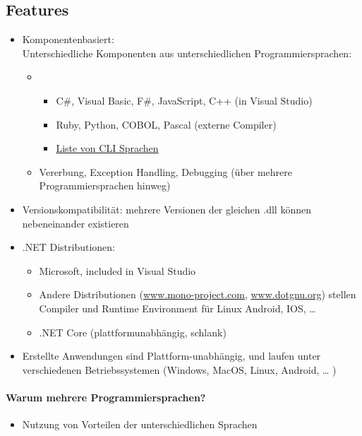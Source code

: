 \subsection{Features}
\begin{itemize}
\item Komponentenbasiert: \\
Unterschiedliche Komponenten aus unterschiedlichen Programmiersprachen:
\begin{itemize}
\item[]
\begin{itemize}
\item C\#, Visual Basic, F\#, JavaScript, C++ (in Visual Studio)
\item Ruby, Python, COBOL, Pascal (externe Compiler)
\item \href{https://en.wikipedia.org/wiki/List_of_CLI_languages}{Liste von CLI Sprachen}
\end{itemize}
\item Vererbung, Exception Handling, Debugging (über mehrere Programmiersprachen hinweg)
\end{itemize}
\item Versionskompatibilität: mehrere Versionen der gleichen .dll können nebeneinander existieren
\item .NET Distributionen:
\begin{itemize}
\item Microsoft, included in Visual Studio
\item Andere Distributionen (\href{http://www.mono-project.com}{www.mono-project.com}, \href{http://www.dotgnu.org}{www.dotgnu.org}) stellen Compiler und Runtime Environment für Linux Android, IOS, … 
\item .NET Core (plattformunabhängig, schlank)
\end{itemize}
\item Erstellte Anwendungen sind Plattform-unabhängig, und laufen unter verschiedenen Betriebssystemen (Windows, MacOS, Linux, Android, … ) 
\end{itemize}

\paragraph{Warum mehrere Programmiersprachen?}

\begin{itemize}
\item Nutzung von Vorteilen der unterschiedlichen Sprachen
\end{itemize}

